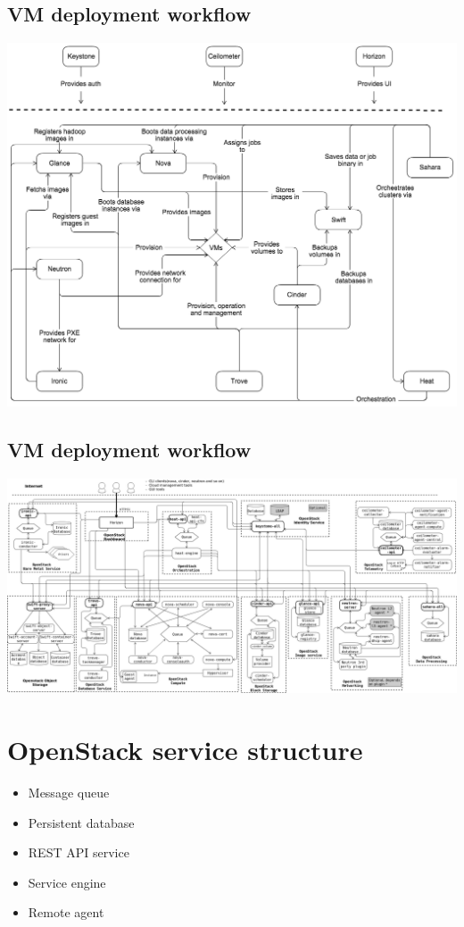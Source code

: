 \documentclass[11pt]{article}
\begin{document}
\subsection*{VM deployment workflow}
\label{sec:org1773114}
\begin{center}
\includegraphics[width=.9\linewidth]{./openstack-conceptual-arch-kilo.png}
\end{center}

\subsection*{VM deployment workflow}
\label{sec:org3ff61f0}
\begin{center}
\includegraphics[width=.9\linewidth]{./openstack-logical-arch-kilo.png}
\end{center}

\section*{OpenStack service structure}
\label{sec:orge2943e6}
\begin{itemize}
\item Message queue
\item Persistent database
\item REST API service
\item Service engine
\item Remote agent
\end{itemize}
\end{document}
